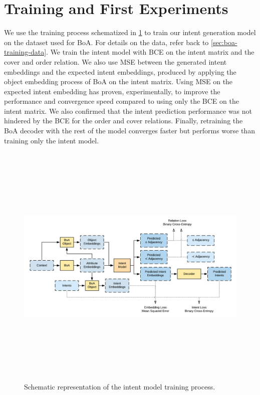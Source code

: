 \section{Training and First Experiments}\label{sec:fcat-expe}
We use the training process schematized in \cref{fig:fcat-training} to train our intent generation model on the dataset used for BoA.
For details on the data, refer back to \cref{sec:boa-training-data}.
We train the intent model with BCE on the intent matrix and the cover and order relation.
We also use MSE between the generated intent embeddings and the expected intent embeddings, produced by applying the object embedding process of BoA on the intent matrix.
Using MSE on the expected intent embedding has proven, experimentally, to improve the performance and convergence speed compared to using only the BCE on the intent matrix.
We also confirmed that the intent prediction performance was not hindered by the BCE for the order and cover relations.
Finally, retraining the BoA decoder with the rest of the model converges faster but performs worse than training only the intent model.

\begin{figure}
\centering
\includegraphics[height=12cm, width=\textwidth, keepaspectratio]{Figures/Ch3/fcat_training.png}
\caption{Schematic representation of the intent model training process.} \label{fig:fcat-training}
\end{figure}

